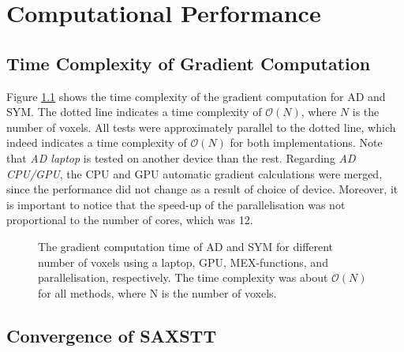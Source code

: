 \chapter{Computational Performance}



\section{Time Complexity of Gradient Computation}

Figure \ref{fig:gradient_time_complexity} shows the time complexity of the gradient computation for AD and SYM.
The dotted line indicates a time complexity of $\mathcal{O}(N)$, where $N$ is the number of voxels.
All tests were approximately parallel to the dotted line, which indeed indicates a time complexity of $\mathcal{O}(N)$ for both implementations.
Note that \emph{AD laptop} is tested on another device than the rest.
Regarding \emph{AD CPU/GPU}, the CPU and GPU automatic gradient calculations were merged, since the performance did not change as a result of choice of device. %
Moreover, it is important to notice that the speed-up of the parallelisation was not proportional to the number of cores, which was 12.
\begin{figure}[h!]
    \centering
    
    \caption[Time Complexity of Gradient Computation]{ The gradient computation time of AD and SYM for different number of voxels using a laptop, GPU, MEX-functions, and parallelisation, respectively. %
        The time complexity was about $\mathcal{O}(N)$ for all methods, where N is the number of voxels.}
    \label{fig:gradient_time_complexity}
\end{figure}

\clearpage
\section{Convergence of SAXSTT}

